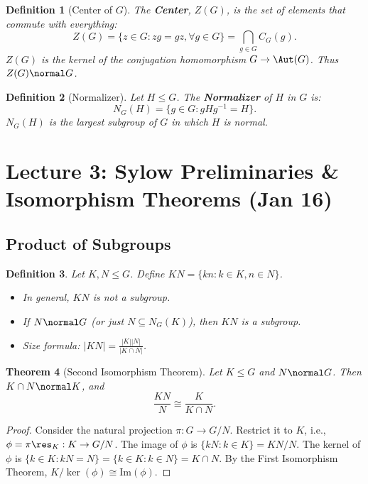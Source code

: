 \documentclass[a4paper,12pt]{article}
\newtheorem{thm}{Theorem}[section]
\newtheorem{defn}[thm]{Definition}
\begin{document}
\begin{defn}[Center of $G$]
    The \textbf{Center}, $Z(G)$, is the set of elements that commute with everything:
    \[ Z(G) = \{z \in G : zg = gz, \forall g \in G\} = \bigcap_{g \in G} C_G(g). \]
    $Z(G)$ is the kernel of the conjugation homomorphism $G \to \Aut(G)$. Thus $Z(G) \normal G$.
\end{defn}

\begin{defn}[Normalizer]
    Let $H \leq G$. The \textbf{Normalizer} of $H$ in $G$ is:
    \[ N_G(H) = \{g \in G : gHg^{-1} = H\}. \]
    $N_G(H)$ is the largest subgroup of $G$ in which $H$ is normal.
\end{defn}

\newpage
\section{Lecture 3: Sylow Preliminaries \& Isomorphism Theorems (Jan 16)}

\subsection{Product of Subgroups}

\begin{defn}
    Let $K, N \leq G$. Define $KN = \{kn : k \in K, n \in N\}$.
    \begin{itemize}
        \item In general, $KN$ is not a subgroup.
        \item If $N \normal G$ (or just $N \subseteq N_G(K)$), then $KN$ is a subgroup.
        \item Size formula: $|KN| = \frac{|K||N|}{|K \cap N|}$.
    \end{itemize}
\end{defn}

\begin{thm}[Second Isomorphism Theorem]
    Let $K \leq G$ and $N \normal G$. Then $K \cap N \normal K$, and
    \[ \frac{KN}{N} \cong \frac{K}{K \cap N}. \]
\end{thm}
\begin{proof}
    Consider the natural projection $\pi: G \to G/N$. Restrict it to $K$, i.e., $\phi = \pi\res_K : K \to G/N$.
    The image of $\phi$ is $\{kN : k \in K\} = KN/N$.
    The kernel of $\phi$ is $\{k \in K : kN = N\} = \{k \in K : k \in N\} = K \cap N$.
    By the First Isomorphism Theorem, $K / \ker(\phi) \cong \text{Im}(\phi)$.
\end{proof}
% 
\end{document}
